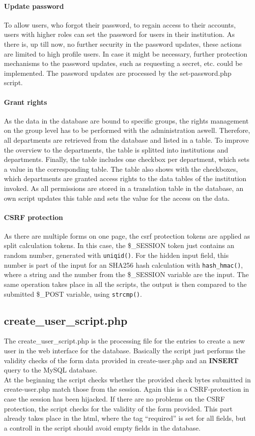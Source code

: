 \paragraph{Update password}
To allow users, who forgot their password, to regain access to their accounts, users with higher roles can set the password for users in their institution. 
As there is, up till now, no further security in the password updates, these actions are limited to high profile users. In case it might be necessary, further protection mechanisms to the 
password updates, such as requesting a secret, etc. could be implemented. The password updates are processed by the set-password.php script.
\paragraph{Grant rights}
As the data in the database are bound to specific groups, the rights management on the group level has to be performed with the administration aswell. Therefore, all departments are 
retrieved from the database and listed in a table. To improve the overview to the departments, the table is splitted into institutions and departments. Finally, the table includes 
one checkbox per department, which sets a value in the corresponding table. The table also shows with the checkboxes, which departments are granted access rights to the data tables 
of the institution invoked. As all permissions are stored in a translation table in the database, an own script updates this table 
and sets the value for the access on the data.
\paragraph{CSRF protection}
As there are multiple forms on one page, the csrf protection tokens are applied as split calculation tokens. In this case, the \$\_SESSION token just contains an random number, generated with 
\texttt{uniqid()}. For the hidden input field, this number is part of the input for an SHA256 hash calculation with \texttt{hash\_hmac()}, where a string and the number from the \$\_SESSION variable are 
the input. The same operation takes place in all the scripts, the output is then compared to the submitted \$\_POST variable, using \texttt{strcmp()}.

\subsection{create\_user\_script.php}
The create\_user\_script.php is the processing file for the entries to create a new user in the web interface for the database. Basically the script just performs the validity checks 
of the form data provided in create-user.php and an \textbf{INSERT} query to the MySQL database.\\
At the beginning the script checks whether the provided check bytes submitted in create-user.php match those from the session. Again this is a CSRF-protection in case the session has
been hijacked. If there are no problems on the CSRF protection, the script checks for the validity of the form provided. This part already takes place in the html, where the tag 
``required'' is set for all fields, but a controll in the script should avoid empty fields in the database.
